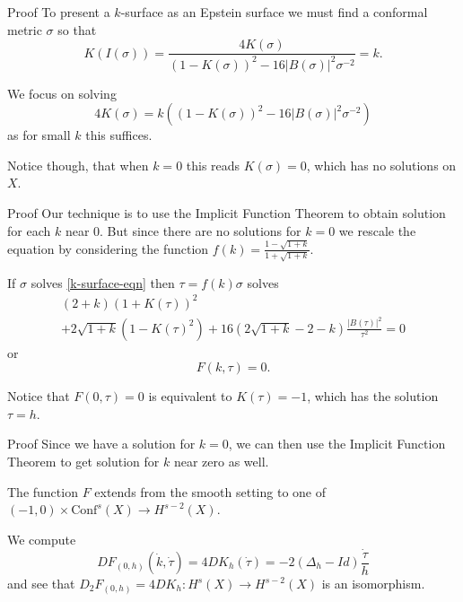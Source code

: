 \documentclass[professionalfont]{beamer}
\begin{document}


\begin{frame}{Proof}
To present a $k$-surface as an Epstein surface we must find a conformal metric $\sigma$ so that
\[
K(I(\sigma)) = \frac{4K(\sigma)}{(1-K(\sigma))^2 - 16|B(\sigma)|^2\sigma^{-2}} = k.
\] \pause

We focus on solving 
\begin{equation}\tag{$\ast$}\label{k-surface-eqn}
4K(\sigma) = k \left((1-K(\sigma))^2 - 16|B(\sigma)|^2\sigma^{-2} \right)
\end{equation}
as for small $k$ this suffices. 
\newline \pause


Notice though, that when $k=0$ this reads $K(\sigma) = 0$, which has no solutions on $X$.
\end{frame}




\begin{frame}{Proof}
Our technique is to use the Implicit Function Theorem to obtain solution for each $k$ near 0. But since there are no solutions for $k = 0$ we rescale the equation by considering the function $f(k) = \frac{1-\sqrt{1+k}}{1+\sqrt{1+k}}$. 
\newline \pause

If $\sigma$ solves \eqref{k-surface-eqn} then $\tau = f(k)\sigma$ solves 
\begin{multline*}
(2+k)(1+K(\tau))^2  \\ + 2\sqrt{1+k}\left(1-K(\tau)^2 \right) +16\left(2\sqrt{1+k} - 2 - k  \right)\frac{|B(\tau)|^2}{\tau^2} = 0
\end{multline*}or 
\[
F(k,\tau) = 0.
\]\pause


Notice that $F(0,\tau) = 0$ is equivalent to $K(\tau) = -1$, which has the solution $\tau = h$. 
\end{frame}




\begin{frame}{Proof}
Since we have a solution for $k = 0$, we can then use the Implicit Function Theorem to get solution for $k$ near zero as well. 
\newline

The function $F$ extends from the smooth setting to one of $(-1,0) \times \mathrm{Conf}^s(X) \to H^{s-2}(X)$. \pause
\newline

We compute
\[
DF_{(0,h)}(\dot{k},\dot{\tau}) = 4D K_h(\dot{\tau}) =-2(\Delta_h - Id)\frac{\dot{\tau}}{h}
\]
and see that $D_2F_{(0,h)} = 4D K_h: H^s(X) \to H^{s-2}(X)$ is an isomorphism.
\newline

\end{frame}
\end{document}

